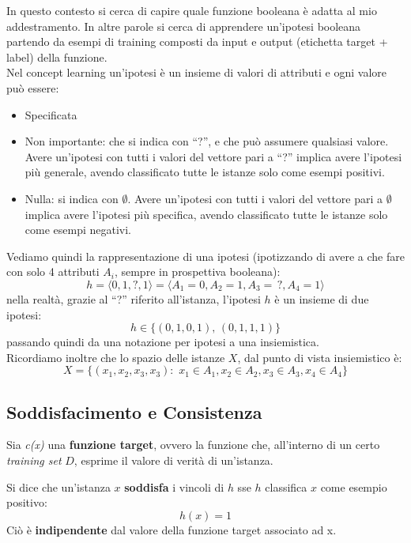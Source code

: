 In questo contesto si cerca di capire quale funzione booleana è adatta al mio
addestramento. In altre parole si cerca di apprendere un'ipotesi booleana
partendo da esempi di training composti da input e output (etichetta target + label) della
funzione. \\
Nel concept learning un'ipotesi è un insieme di valori di attributi e ogni
valore può essere:
\begin{itemize}
  \item Specificata
  \item Non importante: che si indica con ``?'', e che può assumere qualsiasi
  valore. Avere un'ipotesi con tutti i valori del vettore pari a ``?'' implica
  avere l'ipotesi più generale, avendo classificato tutte le istanze solo come
  esempi positivi. 
  \item Nulla: si indica con $\emptyset$. Avere un'ipotesi con tutti i valori
  del vettore pari a $\emptyset$ implica avere l'ipotesi più specifica, avendo
  classificato tutte le istanze solo come esempi negativi. 
\end{itemize}
\begin{esempio}
  Vediamo quindi la rappresentazione di una ipotesi (ipotizzando di avere a che
  fare con solo 4 attributi $A_i$, sempre in prospettiva booleana):
  \[h=\langle 0, 1, ?, 1\rangle = \langle A_1=0, A_2=1, A_3=\,?, A_4=1\rangle\]
  nella realtà, grazie al ``?'' riferito all'istanza, l'ipotesi $h$ è un insieme
  di due ipotesi: 
  \[h\in\{(0, 1, 0, 1),\,(0, 1, 1, 1)\}\]
  passando quindi da una notazione per ipotesi a una insiemistica.\\
  Ricordiamo inoltre che lo spazio delle istanze $X$, dal punto di vista
  insiemistico è:
  \[X=\{(x_1,x_2,x_3,x_3): \,\,x_1\in A_1,x_2\in A_2, x_3\in A_3, x_4\in A_4\}\]
\end{esempio}

\subsection{Soddisfacimento e Consistenza}
Sia \textit{c(x)} una \textbf{funzione target}, ovvero la funzione che, all'interno di un certo \textit{training set} $D$, esprime il valore di verità di un'istanza.
\begin{definizione}
Si dice che un'istanza $x$ \textbf{soddisfa} i vincoli di $h$ sse $h$ classifica $x$ come
esempio positivo:
\[h(x)=1\]  
Ciò è \textbf{indipendente} dal valore della funzione target associato ad x.
\end{definizione}

